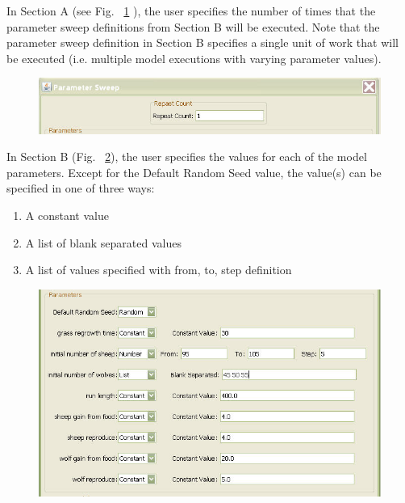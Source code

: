 \documentclass[11pt]{amsart}
\begin{document}
In Section A (see Fig. ~\ref{fig:sweep2} ), the user specifies the number of times that the parameter sweep definitions from Section B will be executed. Note that the parameter sweep definition in Section B specifies a single unit of work that will be executed (i.e. multiple model executions with varying parameter values).\\

\begin{figure}[h]
\begin{center}
\vspace{.2in}
\centerline {
\includegraphics{images/sweep2.jpg}
}
\caption{}
\label{fig:sweep2}
\end{center}
\end{figure}

In Section B (Fig. ~\ref{fig:sweep3}), the user specifies the values for each of the model parameters. Except for the Default Random Seed value, the value(s) can be specified in one of three ways:

\begin{enumerate}
\item A constant value 
\item A list of blank separated values
\item A list of values specified with from, to, step definition
\end{enumerate}
\vspace{.2in}

\begin{figure}[h]
\begin{center}
\vspace{.2in}
\centerline {
\includegraphics{images/sweep3.jpg}
}
\caption{}
\label{fig:sweep3}
\end{center}
\end{figure}
\end{document}
